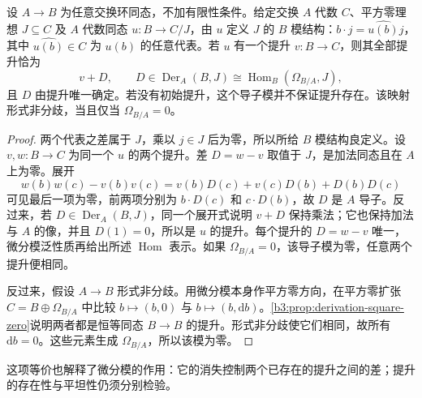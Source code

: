 \begin{theorem}\label{b3:thm:formally-unramified-differentials}
	设 \(A\to B\) 为任意交换环同态，不加有限性条件。给定交换 \(A\) 代数 \(C\)、平方零理想 \(J\subseteq C\) 及 \(A\) 代数同态 \(u:B\to C/J\)，由 \(u\) 定义 \(J\) 的 \(B\) 模结构：\(b\cdot j=\widehat{u(b)}j\)，其中 \(\widehat{u(b)}\in C\) 为 \(u(b)\) 的任意代表。若 \(u\) 有一个提升 \(v:B\to C\)，则其全部提升恰为
	\[
		v+D,\qquad D\in\operatorname{Der}_A(B,J) \cong\operatorname{Hom}_B(\Omega_{B/A},J),
	\]
	且 \(D\) 由提升唯一确定。若没有初始提升，这个导子模并不保证提升存在。该映射形式非分歧，当且仅当 \(\Omega_{B/A}=0\)。
\end{theorem}
\begin{proof}
	两个代表之差属于 \(J\)，乘以 \(j\in J\) 后为零，所以所给 \(B\) 模结构良定义。设 \(v,w:B\to C\) 为同一个 \(u\) 的两个提升。差 \(D=w-v\) 取值于 \(J\)，是加法同态且在 \(A\) 上为零。展开
	\[
		w(b)w(c)-v(b)v(c) =v(b)D(c)+v(c)D(b)+D(b)D(c)
	\]
	可见最后一项为零，前两项分别为 \(b\cdot D(c)\) 和 \(c\cdot D(b)\)，故 \(D\) 是 \(A\) 导子。反过来，若 \(D\in\operatorname{Der}_A(B,J)\)，同一个展开式说明 \(v+D\) 保持乘法；它也保持加法与 \(A\) 的像，并且 \(D(1)=0\)，所以是 \(u\) 的提升。每个提升的 \(D=w-v\) 唯一，微分模泛性质再给出所述 \(\operatorname{Hom}\) 表示。如果 \(\Omega_{B/A}=0\)，该导子模为零，任意两个提升便相同。

	反过来，假设 \(A\to B\) 形式非分歧。用微分模本身作平方零方向，在平方零扩张 \(C=B\oplus\Omega_{B/A}\) 中比较 \(b\mapsto(b,0)\) 与 \(b\mapsto(b,\mathrm{d}b)\)。\cref{b3:prop:derivation-square-zero}说明两者都是恒等同态 \(B\to B\) 的提升。形式非分歧使它们相同，故所有 \(\mathrm{d}b=0\)。这些元素生成 \(\Omega_{B/A}\)，所以该模为零。
\end{proof}

这项等价也解释了微分模的作用：它的消失控制两个已存在的提升之间的差；提升的存在性与平坦性仍须分别检验。

